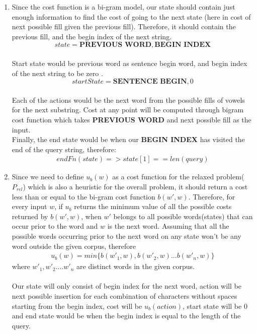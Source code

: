 \documentclass[12pt]{article}
\begin{document}
\begin{enumerate}[label=(\alph*)]
	\item Since the cost function is a bi-gram model, our state should contain just enough information to find the cost of going to the next state (here in cost of next possible fill given the previous fill). Therefore, it should contain the previous fill, and the begin index of the next string. $$state = \textbf{PREVIOUS WORD}, \textbf{BEGIN INDEX} $$ \\
	Start state would be previous word as sentence begin word, and begin index of the next string to be zero . $$ startState = \textbf{SENTENCE BEGIN}, 0 $$ \\
	Each of the actions would be the next word from the possible fills of vowels for the next substring. Cost at any point will be computed through bigram cost function which takes \textbf{PREVIOUS WORD} and next possible fill as the input. \\
	Finally, the end state would be when our \textbf{BEGIN INDEX} has visited the end of the query string, therefore:
	\begin{align*}
	endFn(state) => state[1] == len(query)
	\end{align*}
	\addtocounter{enumi}{1}
	\item Since we need to define $u_b(w)$ as a cost function for the relaxed problem($P_{rel}$) which is also a heuristic for the overall problem, it should return a cost less than or equal to the bi-gram cost function $b(w', w)$. Therefore, for every input $w$, if $u_b$ returns the minimum value of all the possible costs returned by $b(w', w)$, when $w'$ belongs to all possible words(states) that can occur prior to the word and $w$ is the next word. Assuming that all the possible words occurring prior to the next word on any state won't be any word outside the given corpus, therefore
	\begin{align*}
	u_{b}(w) = min \{b(w'_1, w), b(w'_2, w) ... b(w'_n, w)\}
	\end{align*}
	where $w'_1, w'_2 .... w'_n$ are distinct words in the given corpus.\\ \\
	Our state will only consist of begin index for the next word, action will be next possible insertion for each combination of characters without spaces starting from the begin index, cost will be $u_{b}(action)$, start state will be 0 and end state would be when the begin index is equal to the length of the query. \\ \\

\end{enumerate}
\end{document}

